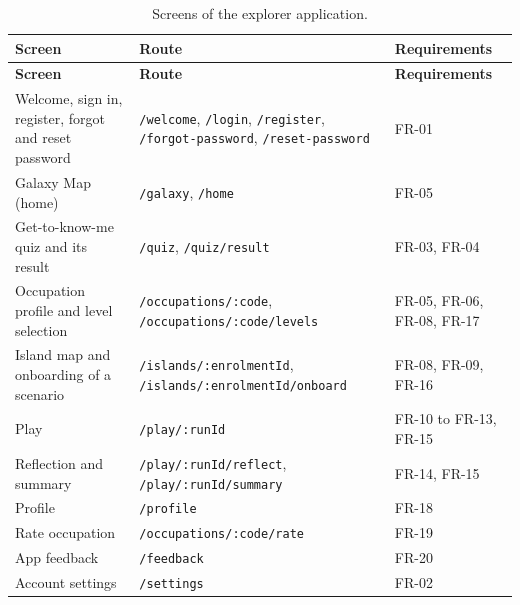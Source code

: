 {\small{}\renewcommand{\arraystretch}{1.1}
\begin{longtable}{|>{\raggedright\arraybackslash}p{}|>{\raggedright\arraybackslash}p{}|>{\raggedright\arraybackslash}p{}|}
\caption{Screens of the explorer application.} \\
\hline
\textbf{Screen} & \textbf{Route} & \textbf{Requirements} \\ \hline
\endfirsthead
\hline
\textbf{Screen} & \textbf{Route} & \textbf{Requirements} \\ \hline
\endhead
Welcome, sign in, register, forgot and reset password & \texttt{/\allowbreak{}welcome}, \texttt{/\allowbreak{}login}, \texttt{/\allowbreak{}register}, \texttt{/\allowbreak{}forgot-\allowbreak{}password}, \texttt{/\allowbreak{}reset-\allowbreak{}password} & FR-01 \\ \hline
Galaxy Map (home) & \texttt{/\allowbreak{}galaxy}, \texttt{/\allowbreak{}home} & FR-05 \\ \hline
Get-\allowbreak{}to-\allowbreak{}know-\allowbreak{}me quiz and its result & \texttt{/\allowbreak{}quiz}, \texttt{/\allowbreak{}quiz/\allowbreak{}result} & FR-03, FR-04 \\ \hline
Occupation profile and level selection & \texttt{/\allowbreak{}occupations/\allowbreak{}:code}, \texttt{/\allowbreak{}occupations/\allowbreak{}:code/\allowbreak{}levels} & FR-05, FR-06, FR-08, FR-17 \\ \hline
Island map and onboarding of a scenario & \texttt{/\allowbreak{}islands/\allowbreak{}:enrolmentId}, \texttt{/\allowbreak{}islands/\allowbreak{}:enrolmentId/\allowbreak{}onboard} & FR-08, FR-09, FR-16 \\ \hline
Play & \texttt{/\allowbreak{}play/\allowbreak{}:runId} & FR-10 to FR-13, FR-15 \\ \hline
Reflection and summary & \texttt{/\allowbreak{}play/\allowbreak{}:runId/\allowbreak{}reflect}, \texttt{/\allowbreak{}play/\allowbreak{}:runId/\allowbreak{}summary} & FR-14, FR-15 \\ \hline
Profile & \texttt{/\allowbreak{}profile} & FR-18 \\ \hline
Rate occupation & \texttt{/\allowbreak{}occupations/\allowbreak{}:code/\allowbreak{}rate} & FR-19 \\ \hline
App feedback & \texttt{/\allowbreak{}feedback} & FR-20 \\ \hline
Account settings & \texttt{/\allowbreak{}settings} & FR-02 \\ \hline
\end{longtable}
}

